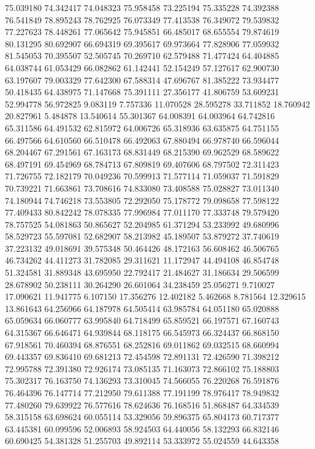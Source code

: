 75.039180
74.342417
74.048323
75.958458
73.225194
75.335228
74.392388
76.541849
78.895243
78.762925
76.073349
77.413538
76.349072
79.539832
77.227623
78.448261
77.065642
75.945851
66.485017
68.655554
79.874619
80.131295
80.692907
66.694319
69.395617
69.973664
77.828906
77.059932
81.545053
70.395507
52.505745
70.269710
62.579488
71.477424
64.404885
64.038744
61.053429
66.082862
61.142441
52.154249
57.127617
62.900730
63.197607
79.003329
77.642300
67.588314
47.696767
81.385222
73.934477
50.418435
64.438975
71.147668
75.391111
27.356177
41.806759
53.609231
52.994778
56.972825
9.083119
7.757336
11.070528
28.595278
33.711852
18.760942
20.827961
5.484878
13.540614
55.301367
64.008391
64.003964
64.742816
65.311586
64.491532
62.815972
64.006726
65.318936
63.635875
64.751155
66.497566
64.610560
66.510478
66.492063
67.880494
66.978740
66.596044
68.204467
67.291561
67.163173
68.831449
68.215390
69.962529
68.589622
68.497191
69.454969
68.784713
67.809819
69.407606
68.797502
72.311423
71.726755
72.182179
70.049236
70.599913
71.577114
71.059037
71.591829
70.739221
71.663861
73.708616
74.833080
73.408588
75.028827
73.011340
74.180944
74.746218
73.553805
72.292050
75.178772
79.098658
77.598122
77.409433
80.842242
78.078335
77.996984
77.011170
77.333748
79.579420
78.757525
54.081863
50.865627
52.204985
61.371294
53.233992
49.680996
58.529723
55.597081
52.682907
58.213982
45.189507
53.879272
37.740619
37.223132
49.018691
39.575348
50.464426
48.172163
56.608462
46.506765
46.734262
44.411273
31.782085
29.311621
11.172947
44.494108
46.854748
51.324581
31.889348
43.695950
22.792417
21.484627
31.186634
29.506599
28.678902
50.238111
30.264290
26.601064
34.238459
25.056271
9.710027
17.090621
11.941775
6.107150
17.356276
12.402182
5.462668
8.781564
12.329615
13.861643
64.256966
64.187978
64.505414
63.985784
64.051180
65.020888
65.059634
66.060777
63.995840
64.718499
65.859521
66.197571
67.160743
64.315367
66.646471
64.939844
68.118175
66.545973
66.324437
66.868150
67.918561
70.460394
68.876551
68.252816
69.011862
69.032515
68.660994
69.443357
69.836410
69.681213
72.454598
72.891131
72.426590
71.398212
72.995788
72.391380
72.926174
73.085135
71.163073
72.866102
75.188803
75.302317
76.163750
74.136293
73.310045
74.566055
76.220268
76.591876
76.464396
76.147714
77.212950
79.611388
77.191199
78.976417
78.949832
77.480260
79.639922
76.577616
78.624636
76.168516
51.868487
64.334539
58.315158
63.698624
60.055114
53.329056
59.896375
65.804173
60.717377
63.445381
60.099596
52.006893
58.924503
64.440056
58.132293
66.832146
60.690425
54.381328
51.255703
49.892114
53.333972
55.024559
44.643358
